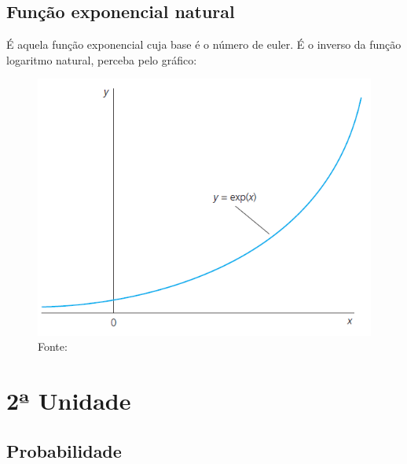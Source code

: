 \documentclass[12pt,a4paper,oneside,brazil]{abntex2}
\begin{document}
\section{Função exponencial natural}
É aquela função exponencial cuja base é o número de euler. É o inverso da função logaritmo natural, perceba pelo gráfico:

\begin{figure}[h]
\includegraphics[scale=0.7]{exponencial natural.png}
\centering
\caption{Fonte: \cite[p. 640]{wooldridge}}
\end{figure}

\chapter{2ª Unidade}
\section{Probabilidade}
\printbibliography
\end{document}
